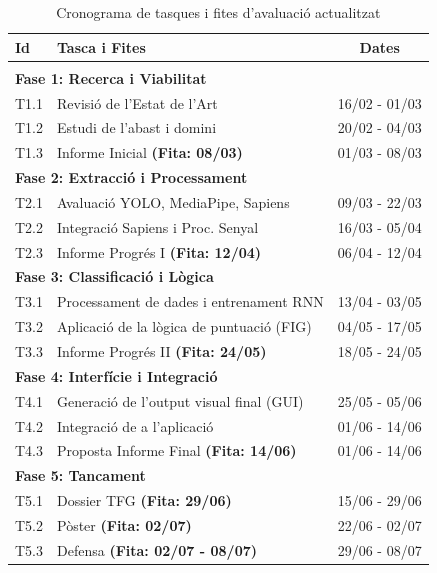 \documentclass[10pt,a4paper,twocolumn,twoside]{article}
\begin{document}
\begin{table}[H]
\centering
\caption{Cronograma de tasques i fites d'avaluació actualitzat}
\label{tab:planificacio}
\renewcommand{\arraystretch}{1.2} 
\begin{tabular}{p{0.8cm} p{10cm} c}
\hline
\textbf{Id} & \textbf{Tasca i Fites} & \textbf{Dates} \\ \hline
\\[-2ex]

\multicolumn{3}{l}{\textbf{Fase 1: Recerca i Viabilitat}} \\ 
T1.1 & Revisió de l'Estat de l'Art & 16/02 - 01/03 \\ 
T1.2 & Estudi de l'abast i domini & 20/02 - 04/03 \\ 
T1.3 & Informe Inicial \textbf{(Fita: 08/03)} & 01/03 - 08/03 \\[1.5ex]

\multicolumn{3}{l}{\textbf{Fase 2: Extracció i Processament}} \\ 
T2.1 & Avaluació YOLO, MediaPipe, Sapiens & 09/03 - 22/03 \\ 
T2.2 & Integració Sapiens i Proc. Senyal & 16/03 - 05/04 \\ 
T2.3 & Informe Progrés I \textbf{(Fita: 12/04)} & 06/04 - 12/04 \\[1.5ex]

\multicolumn{3}{l}{\textbf{Fase 3: Classificació i Lògica}} \\ 
T3.1 & Processament de dades i entrenament RNN & 13/04 - 03/05 \\ 
T3.2 & Aplicació de la lògica de puntuació (FIG) & 04/05 - 17/05 \\ 
T3.3 & Informe Progrés II \textbf{(Fita: 24/05)} & 18/05 - 24/05 \\[1.5ex]

\multicolumn{3}{l}{\textbf{Fase 4: Interfície i Integració}} \\ 
T4.1 & Generació de l'output visual final (GUI) & 25/05 - 05/06 \\ 
T4.2 & Integració de a l'aplicació & 01/06 - 14/06 \\ 
T4.3 & Proposta Informe Final \textbf{(Fita: 14/06)} & 01/06 - 14/06 \\[1.5ex]

\multicolumn{3}{l}{\textbf{Fase 5: Tancament}} \\ 
T5.1 & Dossier TFG \textbf{(Fita: 29/06)} & 15/06 - 29/06 \\ 
T5.2 & Pòster \textbf{(Fita: 02/07)} & 22/06 - 02/07 \\ 
T5.3 & Defensa \textbf{(Fita: 02/07 - 08/07)} & 29/06 - 08/07 \\ \hline
\end{tabular}
\end{table}
\end{document}
